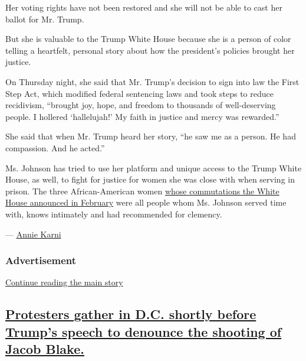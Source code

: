 Her voting rights have not been restored and she will not be able to
cast her ballot for Mr. Trump.

But she is valuable to the Trump White House because she is a person of
color telling a heartfelt, personal story about how the president's
policies brought her justice.

On Thursday night, she said that Mr. Trump's decision to sign into law
the First Step Act, which modified federal sentencing laws and took
steps to reduce recidivism, ``brought joy, hope, and freedom to
thousands of well-deserving people. I hollered `hallelujah!' My faith in
justice and mercy was rewarded.''

She said that when Mr. Trump heard her story, ``he saw me as a person.
He had compassion. And he acted.''

Ms. Johnson has tried to use her platform and unique access to the Trump
White House, as well, to fight for justice for women she was close with
when serving in prison. The three African-American women
\href{https://www.nytimes3xbfgragh.onion/2020/02/18/us/politics/trump-pardons.html}{whose
commutations the White House announced in February} were all people whom
Ms. Johnson served time with, knows intimately and had recommended for
clemency.

--- \href{https://www.nytimes3xbfgragh.onion/by/annie-karni}{Annie
Karni}

\hypertarget{advertisement-2}{%
\subsubsection{Advertisement}\label{advertisement-2}}

\protect\hyperlink{after-dfp-ad-mid3}{Continue reading the main story}

\hypertarget{protesters-gather-in-dc-shortly-before-trumps-speech-to-denounce-the-shooting-of-jacob-blake}{%
\subsection{\texorpdfstring{\protect\hyperlink{protesters-gather-in-dc-shortly-before-trumps-speech-to-denounce-the-shooting-of-jacob-blake}{Protesters
gather in D.C. shortly before Trump's speech to denounce the shooting of
Jacob
Blake.}}{Protesters gather in D.C. shortly before Trump's speech to denounce the shooting of Jacob Blake.}}\label{protesters-gather-in-dc-shortly-before-trumps-speech-to-denounce-the-shooting-of-jacob-blake}}

